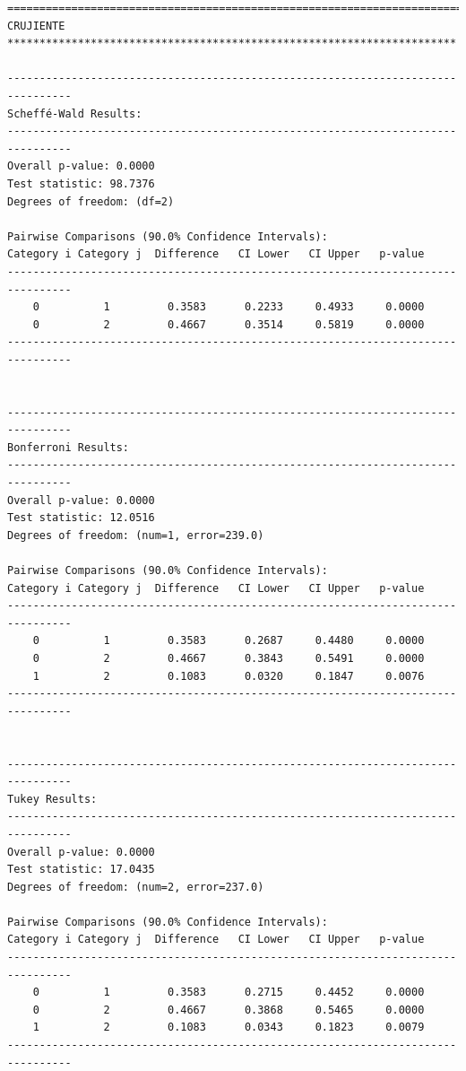 \begin{lstlisting}
================================================================================
CRUJIENTE **********************************************************************

--------------------------------------------------------------------------------
Scheffé-Wald Results:
--------------------------------------------------------------------------------
Overall p-value: 0.0000
Test statistic: 98.7376
Degrees of freedom: (df=2)

Pairwise Comparisons (90.0% Confidence Intervals):
Category i Category j  Difference   CI Lower   CI Upper   p-value  
--------------------------------------------------------------------------------
    0          1         0.3583      0.2233     0.4933     0.0000  
    0          2         0.4667      0.3514     0.5819     0.0000  
--------------------------------------------------------------------------------


--------------------------------------------------------------------------------
Bonferroni Results:
--------------------------------------------------------------------------------
Overall p-value: 0.0000
Test statistic: 12.0516
Degrees of freedom: (num=1, error=239.0)

Pairwise Comparisons (90.0% Confidence Intervals):
Category i Category j  Difference   CI Lower   CI Upper   p-value  
--------------------------------------------------------------------------------
    0          1         0.3583      0.2687     0.4480     0.0000  
    0          2         0.4667      0.3843     0.5491     0.0000  
    1          2         0.1083      0.0320     0.1847     0.0076  
--------------------------------------------------------------------------------


--------------------------------------------------------------------------------
Tukey Results:
--------------------------------------------------------------------------------
Overall p-value: 0.0000
Test statistic: 17.0435
Degrees of freedom: (num=2, error=237.0)

Pairwise Comparisons (90.0% Confidence Intervals):
Category i Category j  Difference   CI Lower   CI Upper   p-value  
--------------------------------------------------------------------------------
    0          1         0.3583      0.2715     0.4452     0.0000  
    0          2         0.4667      0.3868     0.5465     0.0000  
    1          2         0.1083      0.0343     0.1823     0.0079  
--------------------------------------------------------------------------------


\end{lstlisting}
